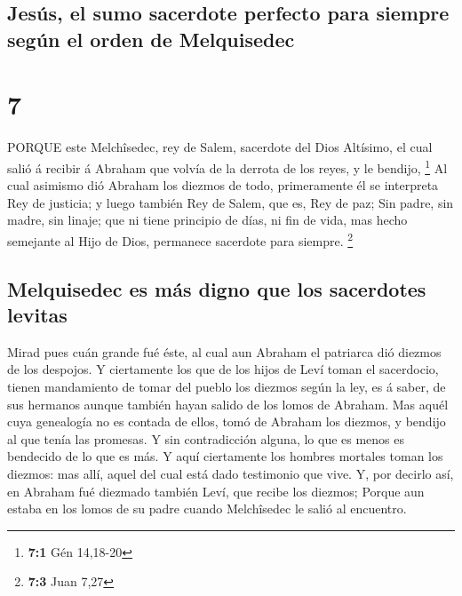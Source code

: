 \hypertarget{jesuxfas-el-sumo-sacerdote-perfecto-para-siempre-seguxfan-el-orden-de-melquisedec}{%
\subsection{Jesús, el sumo sacerdote perfecto para siempre según el
orden de
Melquisedec}\label{jesuxfas-el-sumo-sacerdote-perfecto-para-siempre-seguxfan-el-orden-de-melquisedec}}

\hypertarget{section-6}{%
\section{7}\label{section-6}}

 PORQUE este Melchîsedec, rey de Salem, sacerdote del Dios
Altísimo, el cual salió á recibir á Abraham que volvía de la derrota de
los reyes, y le bendijo, \footnote{\textbf{7:1} Gén 14,18-20}
 Al cual asimismo dió Abraham los diezmos de todo,
primeramente él se interpreta Rey de justicia; y luego también Rey de
Salem, que es, Rey de paz;  Sin padre, sin madre, sin
linaje; que ni tiene principio de días, ni fin de vida, mas hecho
semejante al Hijo de Dios, permanece sacerdote para siempre. \footnote{\textbf{7:3}
  Juan 7,27}

\hypertarget{melquisedec-es-muxe1s-digno-que-los-sacerdotes-levitas}{%
\subsection{Melquisedec es más digno que los sacerdotes
levitas}\label{melquisedec-es-muxe1s-digno-que-los-sacerdotes-levitas}}

 Mirad pues cuán grande fué éste, al cual aun Abraham el
patriarca dió diezmos de los despojos.  Y ciertamente los
que de los hijos de Leví toman el sacerdocio, tienen mandamiento de
tomar del pueblo los diezmos según la ley, es á saber, de sus hermanos
aunque también hayan salido de los lomos de Abraham.  Mas
aquél cuya genealogía no es contada de ellos, tomó de Abraham los
diezmos, y bendijo al que tenía las promesas.  Y sin
contradicción alguna, lo que es menos es bendecido de lo que es más.
 Y aquí ciertamente los hombres mortales toman los diezmos:
mas allí, aquel del cual está dado testimonio que vive.  Y,
por decirlo así, en Abraham fué diezmado también Leví, que recibe los
diezmos;  Porque aun estaba en los lomos de su padre cuando
Melchîsedec le salió al encuentro.

